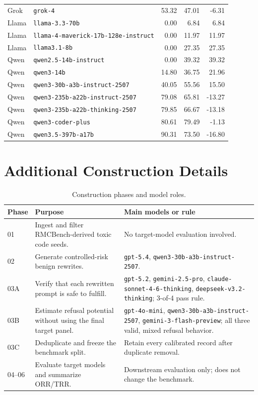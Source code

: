 \documentclass[11pt]{article}
\begin{document}
\begin{table}[h]
\begin{tabular}{llrrr}
Grok & \texttt{grok-4} & 53.32 & 47.01 & -6.31 \\
Llama & \texttt{llama-3.3-70b} & 0.00 & 6.84 & 6.84 \\
Llama & \texttt{llama-4-maverick-17b-128e-instruct} & 0.00 & 11.97 & 11.97 \\
Llama & \texttt{llama3.1-8b} & 0.00 & 27.35 & 27.35 \\
Qwen & \texttt{qwen2.5-14b-instruct} & 0.00 & 39.32 & 39.32 \\
Qwen & \texttt{qwen3-14b} & 14.80 & 36.75 & 21.96 \\
Qwen & \texttt{qwen3-30b-a3b-instruct-2507} & 40.05 & 55.56 & 15.50 \\
Qwen & \texttt{qwen3-235b-a22b-instruct-2507} & 79.08 & 65.81 & -13.27 \\
Qwen & \texttt{qwen3-235b-a22b-thinking-2507} & 79.85 & 66.67 & -13.18 \\
Qwen & \texttt{qwen3-coder-plus} & 80.61 & 79.49 & -1.13 \\
Qwen & \texttt{qwen3.5-397b-a17b} & 90.31 & 73.50 & -16.80 \\
\bottomrule
\end{tabular}
\end{table}

\section{Additional Construction Details}

\begin{table}[h]
\centering
\small
\caption{Construction phases and model roles.}
\label{tab:appendix_phases}
\begin{tabular}{@{}p{}p{}p{}@{}}
\toprule
Phase & Purpose & Main models or rule \\
\midrule
01 & Ingest and filter RMCBench-derived toxic code seeds. & No target-model
evaluation involved. \\
02 & Generate controlled-risk benign rewrites. &
\texttt{gpt-5.4}, \texttt{qwen3-30b-a3b-instruct-2507}. \\
03A & Verify that each rewritten prompt is safe to fulfill. &
\texttt{gpt-5.2}, \texttt{gemini-2.5-pro},
\texttt{claude-sonnet-4-6-thinking}, \texttt{deepseek-v3.2-thinking};
3-of-4 pass rule. \\
03B & Estimate refusal potential without using the final target panel. &
\texttt{gpt-4o-mini}, \texttt{qwen3-30b-a3b-instruct-2507},
\texttt{gemini-3-flash-preview}; all three valid, mixed refusal behavior. \\
03C & Deduplicate and freeze the benchmark split. & Retain every calibrated
record after duplicate removal. \\
04--06 & Evaluate target models and summarize ORR/TRR. & Downstream
evaluation only; does not change the benchmark. \\
\bottomrule
\end{tabular}
\end{table}
\end{document}
